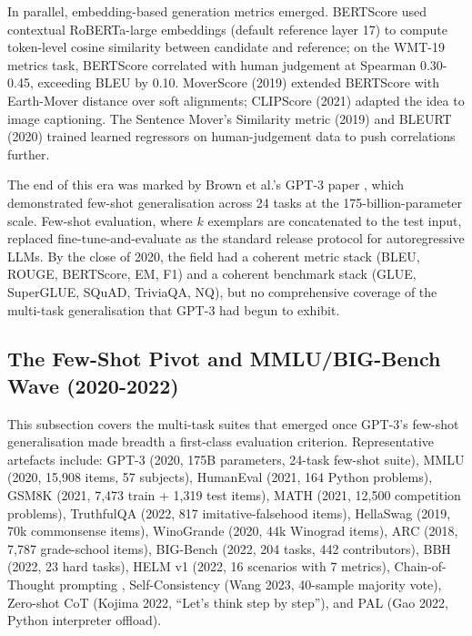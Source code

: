 \documentclass{article}
\begin{document}
In parallel, embedding-based generation metrics emerged. BERTScore \cite{zhang2020bertscoreevaluatin} used contextual RoBERTa-large embeddings (default reference layer 17) to compute token-level cosine similarity between candidate and reference; on the WMT-19 metrics task, BERTScore correlated with human judgement at Spearman 0.30-0.45, exceeding BLEU by 0.10. MoverScore (2019) extended BERTScore with Earth-Mover distance over soft alignments; CLIPScore (2021) \cite{hessel20212021} adapted the idea to image captioning. The Sentence Mover's Similarity metric (2019) and BLEURT (2020) trained learned regressors on human-judgement data to push correlations further.

The end of this era was marked by Brown et al.'s GPT-3 paper \cite{brown20202020}, which demonstrated few-shot generalisation across 24 tasks at the 175-billion-parameter scale. Few-shot evaluation, where \(k\) exemplars are concatenated to the test input, replaced fine-tune-and-evaluate as the standard release protocol for autoregressive LLMs. By the close of 2020, the field had a coherent metric stack (BLEU, ROUGE, BERTScore, EM, F1) and a coherent benchmark stack (GLUE, SuperGLUE, SQuAD, TriviaQA, NQ), but no comprehensive coverage of the multi-task generalisation that GPT-3 had begun to exhibit.

\subsection{The Few-Shot Pivot and MMLU/BIG-Bench Wave (2020-2022)}\label{the-few-shot-pivot-and-mmlubig-bench-wave-2020-2022}

This subsection covers the multi-task suites that emerged once GPT-3's few-shot generalisation made breadth a first-class evaluation criterion. Representative artefacts include: GPT-3 (2020, 175B parameters, 24-task few-shot suite), MMLU (2020, 15,908 items, 57 subjects), HumanEval (2021, 164 Python problems), GSM8K (2021, 7,473 train + 1,319 test items), MATH (2021, 12,500 competition problems), TruthfulQA (2022, 817 imitative-falsehood items), HellaSwag (2019, 70k commonsense items), WinoGrande (2020, 44k Winograd items), ARC (2018, 7,787 grade-school items), BIG-Bench (2022, 204 tasks, 442 contributors), BBH (2022, 23 hard tasks), HELM v1 (2022, 16 scenarios with 7 metrics), Chain-of-Thought prompting \citep{wei2022emergentabilitieso}, Self-Consistency (Wang 2023, 40-sample majority vote), Zero-shot CoT (Kojima 2022, ``Let's think step by step''), and PAL (Gao 2022, Python interpreter offload).
\end{document}
